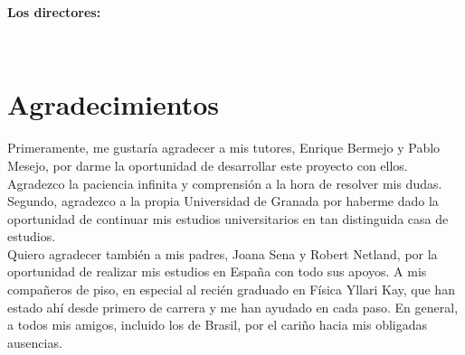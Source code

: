 \textbf{Los directores:}

\vspace{5cm}

\noindent \textbf{\myProf \ \ \ \ \ \myOtherProf}

\chapter*{Agradecimientos}

\thispagestyle{empty}
       \vspace{1cm}


Primeramente, me gustaría agradecer a mis tutores, Enrique Bermejo y Pablo Mesejo,
por darme la oportunidad de desarrollar este proyecto con ellos. 
Agradezco la paciencia infinita y comprensión a la hora de resolver mis dudas. 
Segundo, agradezco a la propia Universidad de Granada por haberme dado la oportunidad 
de continuar mis estudios universitarios en tan distinguida casa de estudios. 
\\

Quiero agradecer también a mis padres, Joana Sena y Robert Netland, por la oportunidad 
de realizar mis estudios en España con todo sus apoyos. A mis compañeros de piso,
en especial al recién graduado en Física Yllari Kay, que han estado ahí desde 
primero de carrera y me han ayudado en cada paso. En general, a todos mis amigos, incluido los de Brasil,
por el cariño hacia mis obligadas ausencias. 
